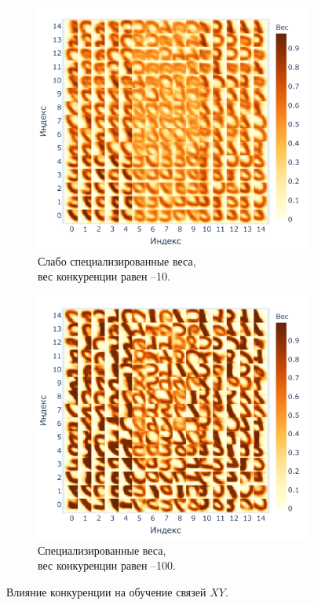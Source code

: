 \documentclass[a4paper]{article}
\begin{document}
\begin{figure}[H]
\centering
\begin{subfigure}{0.45\textwidth}
    \includegraphics[width=\textwidth,keepaspectratio=true]{weights_XY_bad_ru.pdf}
    \caption{Слабо специализированные веса,\\ вес конкуренции равен --10.}
\end{subfigure}
\begin{subfigure}{0.45\textwidth}
    \includegraphics[width=\textwidth,keepaspectratio=true]{weights_XY_good_ru.pdf}
    \caption{Специализированные веса,\\ вес конкуренции равен --100.}
\end{subfigure}
\caption{Влияние конкуренции на обучение связей $XY$.}
\label{competition-training-importance}
\end{figure}
\end{document}
